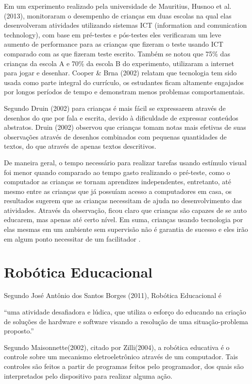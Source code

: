 Em um experimento realizado pela universidade de Mauritius, Husnoo et al. (2013), monitoraram o desempenho de crianças em duas escolas na qual elas desenvolveram atividades utilizando sistemas ICT (information and comunication technology), com base em pré-testes e pós-testes eles verificaram um leve aumento de performance para as crianças que fizeram o teste usando ICT comparado com as que fizeram teste escrito. Também se notou que 75\% das crianças da escola A e 70\% da escola B do experimento, utilizaram a internet para jogar e desenhar. Cooper \& Brna (2002) relatam que tecnologia tem sido usada como parte integral do currículo, os estudantes ficam altamente engajados por longos períodos de tempo e demonstram menos problemas comportamentais. 

Segundo Druin (2002) para crianças é mais fácil se expressarem através de desenhos do que por fala e escrita, devido à dificuldade de expressar conteúdos abstratos. Druin (2002) observou que crianças tomam notas mais efetivas de suas observações através de desenhos combinados com pequenas quantidades de textos, do que através de apenas textos descritivos.

De maneira geral, o tempo necessário para realizar tarefas usando estímulo visual foi menor quando comparado ao tempo gasto realizando o pré-teste, como o computador as crianças se tornam aprendizes independentes, entretanto, até mesmo entre as crianças que já possuíam acesso a computadores em casa, os resultados sugerem que as crianças necessitam de ajuda no desenvolvimento das atividades. Através da observação, ficou claro que crianças são capazes de se auto educarem, mas apenas até certo nível. Em suma, crianças usando tecnologia por elas mesmas em um ambiente sem supervisão não é garantia de sucesso e eles irão em algum ponto necessitar de um facilitador \cite{husnoo:2013}.

\section{Robótica Educacional}

Segundo José Antônio dos Santos Borges (2011), Robótica Educacional é

“uma atividade desafiadora e lúdica, que utiliza o esforço do educando na criação de soluções de hardware e software visando a resolução de uma situação-problema proposto.”

Segundo Maisonnette(2002), citado por Zilli(2004), a robótica educativa é o controle sobre um mecanismo eletroeletrônico através de um computador. Tais controles são feitos a partir de programas feitos pelo programador, dos quais são interpretados pelo dispositivo para realizar alguma ação.


